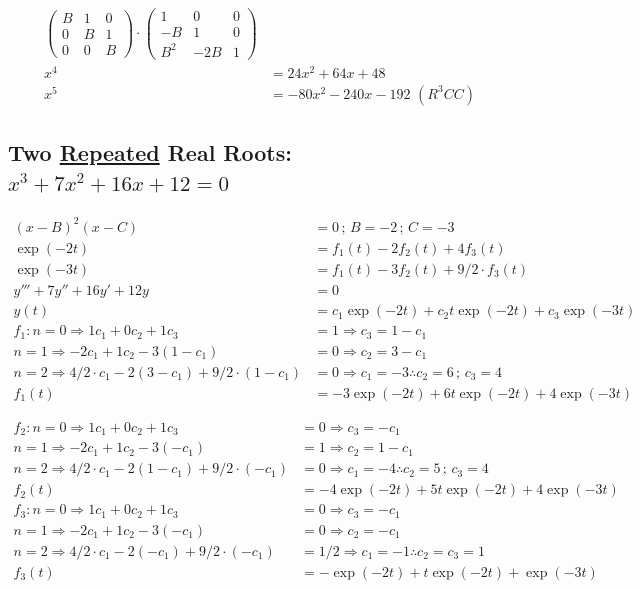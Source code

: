 \documentclass[12pt,a4paper]{article}
\begin{document}
\begin{align}
\left( \begin{matrix} B & 1 & 0 \\  0 & B & 1 \\ 0 & 0 & B  \end{matrix} \right) \cdot
\left( \begin{matrix} 1 & 0 & 0 \\ -B & 1 & 0 \\ B^2 & -2B & 1 \end{matrix} \right) \\
x^4 &= 24x^2 + 64x + 48 \\
x^5 &= - 80 x^2 - 240 x - 192\,\,(R^3CC)
\end{align}

\subsection{Two \href{}{Repeated} Real Roots: $x^3 + 7 x^2 + 16 x + 12 = 0$}

\begin{align}
(x - B)^2 (x - C) &= 0\,;\,B = -2\,;\,C = -3 \\
\exp (-2t) &= f_1(t) - 2 f_2(t) + 4 f_3(t) \\
\exp (-3t) &= f_1(t) - 3 f_2(t) + 9/2\cdot f_3(t) \\
y''' + 7y'' + 16y' + 12y &= 0 \\
y(t) &= c_1 \exp(-2t) + c_2 t \exp(-2t) + c_3 \exp(-3t) \\
f_1: n = 0 \Rightarrow 1 c_1 + 0 c_2 + 1 c_3 &= 1 \Rightarrow c_3 = 1 - c_1 \\
n = 1 \Rightarrow -2 c_1 + 1 c_2 - 3 (1 - c_1) &= 0 \Rightarrow c_2 = 3 - c_1 \\
n = 2 \Rightarrow 4/2\cdot c_1 - 2 (3 - c_1) + 9/2\cdot (1 - c_1) &= 0 \Rightarrow c_1 = -3 \therefore c_2 = 6\,;\,c_3 = 4 \\
f_1(t) &= -3 \exp(-2t) + 6 t \exp(-2t) + 4 \exp(-3t)
\end{align}

\begin{align}
f_2: n = 0 \Rightarrow 1 c_1 + 0 c_2 + 1 c_3 &= 0 \Rightarrow c_3 = - c_1 \\
n = 1 \Rightarrow -2 c_1 + 1 c_2 - 3 (-c_1) &= 1 \Rightarrow c_2 = 1 - c_1 \\
n = 2 \Rightarrow 4/2\cdot c_1 - 2 (1 - c_1) + 9/2\cdot (- c_1) &= 0 \Rightarrow c_1 = -4  \therefore c_2 = 5\,;\,c_3 = 4 \\
f_2(t) &= -4 \exp(-2t) + 5 t \exp(-2t) + 4 \exp(-3t) \\
f_3: n = 0 \Rightarrow 1 c_1 + 0 c_2 + 1 c_3 &= 0 \Rightarrow c_3 = - c_1 \\
n = 1 \Rightarrow -2 c_1 + 1 c_2 - 3 (-c_1) &= 0 \Rightarrow c_2 = - c_1 \\
n = 2 \Rightarrow 4/2\cdot c_1 - 2 (-c_1) + 9/2\cdot (-c_1) &= 1/2 \Rightarrow c_1 = -1  \therefore c_2 = c_3 = 1 \\
f_3(t) &= - \exp(-2t) + t \exp(-2t) + \exp(-3t)
\end{align}
\end{document}
